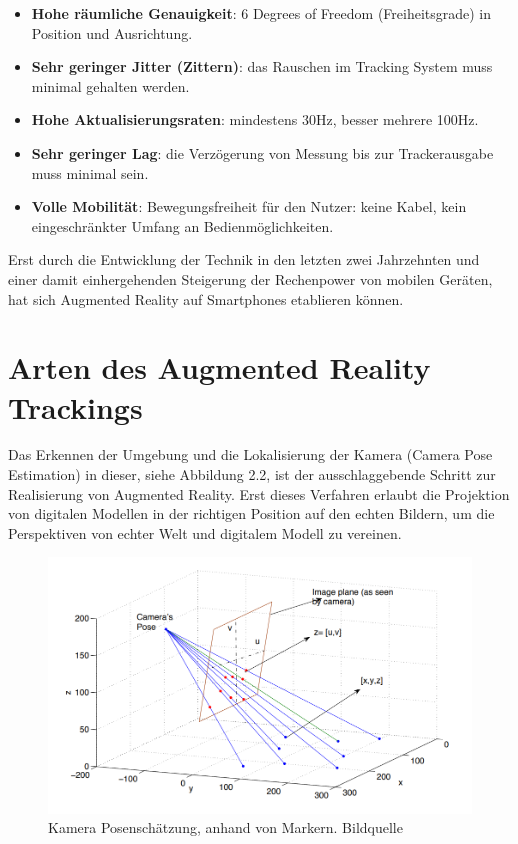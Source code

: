 \begin{itemize}

\item \textbf{Hohe räumliche Genauigkeit}: 6 \glqq Degrees of Freedom\grqq{} (Freiheitsgrade) in Position und Ausrichtung. 

\item \textbf{Sehr geringer Jitter (Zittern)}: das Rauschen im Tracking System muss minimal gehalten werden.

\item \textbf{Hohe Aktualisierungsraten}: mindestens 30Hz, besser mehrere 100Hz.

\item \textbf{Sehr geringer Lag}: die Verzögerung von Messung bis zur Trackerausgabe muss minimal sein.

\item \textbf{Volle Mobilität}: Bewegungsfreiheit für den Nutzer: keine Kabel, kein eingeschränkter Umfang an Bedienmöglichkeiten.
\end{itemize}

Erst durch die Entwicklung der Technik in den letzten zwei Jahrzehnten und einer damit einhergehenden Steigerung der Rechenpower von mobilen Geräten, hat sich Augmented Reality auf Smartphones etablieren können.

\section{Arten des Augmented Reality Trackings}

Das Erkennen der Umgebung und die Lokalisierung der Kamera (Camera Pose Estimation) in dieser, siehe Abbildung 2.2, ist der ausschlaggebende Schritt zur Realisierung von Augmented Reality. Erst dieses Verfahren erlaubt die Projektion von digitalen Modellen in der richtigen Position auf den echten Bildern, um die Perspektiven von echter Welt und digitalem Modell zu vereinen. 


\begin{figure}[H]
	\centering
	\includegraphics[scale=0.58]{pose.png}
	\caption{Kamera Posenschätzung, anhand von Markern. Bildquelle \cite{pose}}
\end{figure} 


